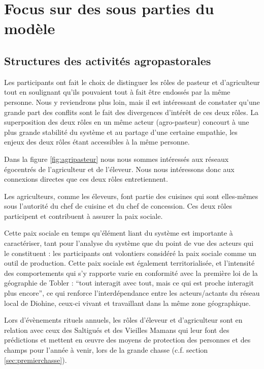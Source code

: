 \chapter{Focus sur des sous parties du modèle}

\section{Structures des activités agropastorales}

Les participants ont fait le choix de distinguer les rôles de pasteur et d'agriculteur tout en soulignant qu'ils pouvaient tout à fait être endossés par la même personne. Nous y reviendrons plus loin, mais il est intéressant de constater qu'une grande part des conflits sont le fait des divergences d'intérêt de ces deux rôles. La superposition des deux rôles en un même acteur (agro-pasteur) concourt à une plus grande stabilité du système et au partage d'une certaine empathie, les enjeux des deux rôles étant accessibles à la même personne.

Dans la figure \ref{fig:agripasteur} nous nous sommes intéressés aux réseaux égocentrés de l'agriculteur et de l'éleveur. Nous nous intéressons donc aux connexions directes que ces deux rôles entretiennent.

Les agriculteurs, comme les éleveurs, font partie des cuisines qui sont elles-mêmes sous l'autorité du chef de cuisine et du chef de concession. Ces deux rôles participent et contribuent à assurer la paix sociale.

Cette paix sociale en temps qu'élément liant du système est importante à caractériser, tant pour l'analyse du système que du point de vue des acteurs qui le constituent : les participants ont volontiers considéré la paix sociale comme un outil de production. Cette paix sociale est également territorialisée, et l'intensité des comportements qui s'y rapporte varie en conformité avec la première loi de la géographie de Tobler : “tout interagit avec tout, mais ce qui est proche interagit plus encore”, ce qui renforce l'interdépendance entre les acteurs/actants du réseau local de Diohine, ceux-ci vivant et travaillant dans la même zone géographique.

Lors d'évènements rituels annuels, les rôles d'éleveur et d'agriculteur sont en relation avec ceux des Saltigués et des Vieilles Mamans qui leur font des prédictions et mettent en œuvre des moyens de protection des personnes et des champs pour l'année à venir, lors de la grande chasse (c.f. section \ref{sec:premierchasse}).

